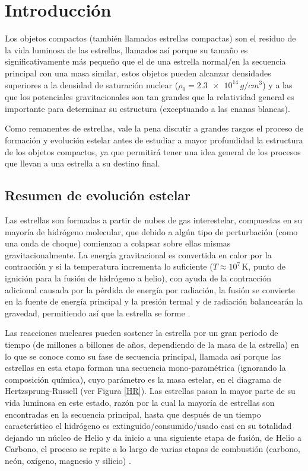 \chapter{Introducción}

Los objetos compactos (también llamados estrellas compactas) son el residuo de la vida luminosa de las estrellas, llamados así porque su tamaño es significativamente más pequeño que el de una estrella normal/en la secuencia principal con una masa similar, estos objetos pueden alcanzar densidades superiores a la densidad de saturación nuclear  ($\rho_0=\num{2.3e+14}\,\si{g/cm^3}$) y a las que los potenciales gravitacionales son tan grandes que la relatividad general es importante para determinar su estructura (exceptuando a las enanas blancas). 

Como remanentes de estrellas, vale la pena discutir a grandes rasgos el proceso de formación y evolución estelar antes de estudiar a mayor profundidad la estructura de los objetos compactos, ya que permitirá tener una idea general de los procesos que llevan a una estrella a su destino final.    

\section{Resumen de evolución estelar}
Las estrellas son formadas a partir de nubes de gas interestelar, compuestas en su mayoría de hidrógeno molecular, que debido a algún tipo de perturbación (como una onda de choque) comienzan a colapsar sobre ellas mismas gravitacionalmente. La energía gravitacional es convertida en calor por la contracción y si la temperatura incrementa lo suficiente ($T \approx 10^7 \, \si{\kelvin}$, punto de ignición para la fusión de hidrógeno a helio), con ayuda de la contracción adicional causada por la pérdida de energía por radiación, la fusión se convierte en la fuente de energía principal y la presión termal y de radiación balancearán la gravedad, permitiendo así que la estrella se forme \cite{Glendenning2000,Padmanabhan2000}.

Las reacciones nucleares pueden sostener la estrella por un gran periodo de tiempo (de millones a billones de años, dependiendo de la masa de la estrella) en lo que se conoce como su fase de secuencia principal, llamada así porque las estrellas en esta etapa forman una secuencia mono-paramétrica (ignorando la composición química), cuyo parámetro es la masa estelar, en el diagrama de Hertzsprung-Russell (ver Figura \ref{HR}).
Las estrellas pasan la mayor parte de su vida luminosa en este estado, razón por la cual la mayoría de estrellas son encontradas en la secuencia principal, hasta que después de un tiempo característico el hidrógeno es extinguido/consumido/usado casi en su totalidad dejando un núcleo de Helio y da inicio a una siguiente etapa de fusión, de Helio a Carbono, el proceso se repite a lo largo de varias etapas de combustión (carbono, neón, oxígeno, magnesio y silicio) \cite{Scilla2016}. 

